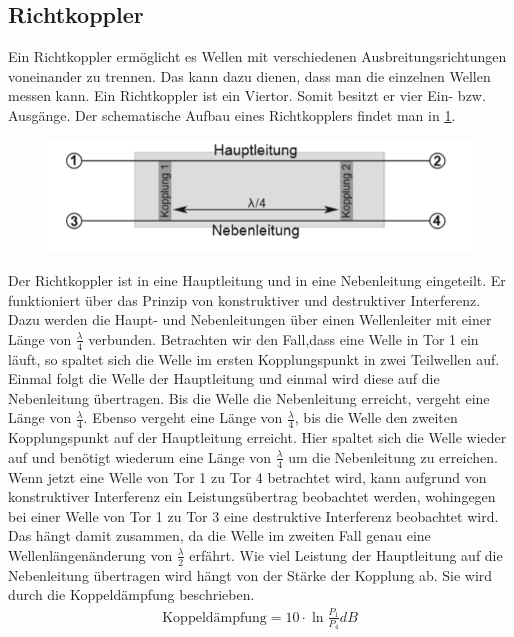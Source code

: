 \subsection{Richtkoppler}
Ein Richtkoppler ermöglicht es Wellen mit verschiedenen Ausbreitungsrichtungen voneinander zu trennen. Das kann dazu dienen, dass man die einzelnen Wellen messen kann. Ein Richtkoppler ist ein Viertor. Somit besitzt er vier Ein- bzw. Ausgänge. Der schematische Aufbau eines Richtkopplers findet man in \cref{RB}. 
\begin{figure}[h!]
	\centering
	\includegraphics[scale = 1]{Richt-Bild.PNG}
	\caption{}
	\label{RB}
\end{figure}
Der Richtkoppler ist in eine Hauptleitung und in eine Nebenleitung eingeteilt. Er funktioniert über das Prinzip von konstruktiver und destruktiver Interferenz. Dazu werden die Haupt- und Nebenleitungen über einen Wellenleiter mit  einer Länge von $\frac{\lambda}{4}$ verbunden. Betrachten wir den Fall,dass eine Welle in Tor 1 ein läuft, so spaltet sich die Welle im ersten Kopplungspunkt in zwei Teilwellen auf. Einmal folgt die Welle der Hauptleitung und einmal wird diese auf die Nebenleitung übertragen. Bis die Welle die Nebenleitung erreicht, vergeht eine Länge von $\frac{\lambda}{4}$. Ebenso vergeht eine Länge von $\frac{\lambda}{4}$, bis die Welle den zweiten Kopplungspunkt auf der Hauptleitung erreicht. Hier spaltet sich die Welle wieder auf und benötigt wiederum eine Länge von $\frac{\lambda}{4}$ um die Nebenleitung zu erreichen. Wenn jetzt eine Welle von Tor 1 zu Tor 4 betrachtet wird, kann aufgrund von konstruktiver Interferenz ein Leistungsübertrag beobachtet werden, wohingegen bei einer Welle von Tor 1 zu Tor 3 eine destruktive Interferenz beobachtet wird. Das hängt damit zusammen, da die Welle im zweiten Fall genau eine Wellenlängenänderung von $\frac{\lambda}{2}$ erfährt.
Wie viel Leistung der Hauptleitung auf die Nebenleitung übertragen wird hängt von der Stärke der Kopplung ab. Sie wird durch die Koppeldämpfung beschrieben.
\begin{align}
\text{Koppeldämpfung} = 10\cdot \ln{\frac{P_1}{P_4}}dB
\label{KppF}
\end{align}
